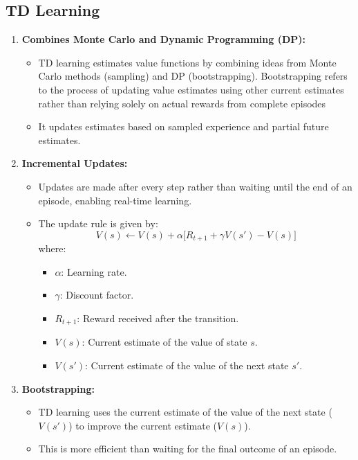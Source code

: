 \documentclass[12pt,a4paper]{article}
\begin{document}
\subsection{TD Learning}
\begin{enumerate}
    \item \textbf{Combines Monte Carlo and Dynamic Programming (DP):}
    \begin{itemize}
        \item TD learning estimates value functions by combining ideas from Monte Carlo methods (sampling) and DP (bootstrapping). Bootstrapping refers to the process of updating value estimates using other current estimates rather than relying solely on actual rewards from complete episodes
        \item It updates estimates based on sampled experience and partial future estimates.
    \end{itemize}

    \item \textbf{Incremental Updates:}
    \begin{itemize}
        \item Updates are made after every step rather than waiting until the end of an episode, enabling real-time learning.
        \item The update rule is given by:
        \[
        V(s) \gets V(s) + \alpha \big[ R_{t+1} + \gamma V(s') - V(s) \big]
        \]
        where:
        \begin{itemize}
            \item \( \alpha \): Learning rate.
            \item \( \gamma \): Discount factor.
            \item \( R_{t+1} \): Reward received after the transition.
            \item \( V(s) \): Current estimate of the value of state \( s \).
            \item \( V(s') \): Current estimate of the value of the next state \( s' \).
        \end{itemize}
    \end{itemize}

    \item \textbf{Bootstrapping:}
    \begin{itemize}
        \item TD learning uses the current estimate of the value of the next state (\( V(s') \)) to improve the current estimate (\( V(s) \)).
        \item This is more efficient than waiting for the final outcome of an episode.
    \end{itemize}


\end{enumerate}
\end{document}
